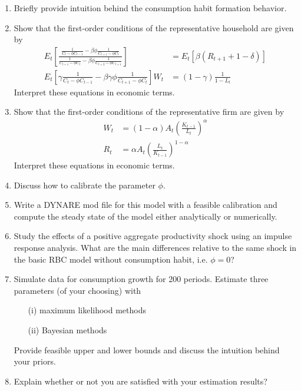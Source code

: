\documentclass[a4paper]{scrartcl}
\begin{document}
\begin{enumerate}
	\item Briefly provide intuition behind the consumption habit formation behavior.
	\item Show that the first-order conditions of the representative household are given by
	\begin{align*}
	E_t\left[ \frac{\frac{1}{C_{t}-\phi C_{t-1}}-\beta \phi \frac{1}{C_{t+1}-\phi C_{t}}}{\frac{1}{C_{t+1}-\phi C_{t}}-\beta \phi \frac{1}{C_{t+2}-\phi C_{t+1}}} \right] &= E_t \left[\beta (R_{t+1}+1-\delta)\right]
	\\
	E_t\left[\gamma \frac{1}{C_t - \phi C_{t-1}}-\beta \gamma \phi \frac{1}{C_{t+1} - \phi C_{t}}\right]W_t &= (1-\gamma)\frac{1}{1-L_t} 
	\end{align*}
	Interpret these equations in economic terms.

	\item Show that the first-order conditions of the representative firm are given by
	\begin{align*}
	W_t &= (1-\alpha) A_t \left(\frac{K_{t-1}}{L_t}\right)^\alpha\\
	R_t &= \alpha A_t \left(\frac{L_t}{K_{t-1}}\right)^{1-\alpha}
	\end{align*}
	Interpret these equations in economic terms.
	\item Discuss how to calibrate the parameter $\phi$.
	\item Write a DYNARE mod file for this model with a feasible calibration and compute the steady state of the model either analytically or numerically.
	\item Study the effects of a positive aggregate productivity shock using an impulse response analysis. What are the main differences relative to the same shock in the basic RBC model without consumption habit, i.e. $\phi=0$?
	\item Simulate data for consumption growth for 200 periods. Estimate three parameters (of your choosing) with 
	\begin{itemize}
		\item[(i)] maximum likelihood methods
		\item[(ii)] Bayesian methods
	\end{itemize}
	Provide feasible upper and lower bounds and discuss the intuition behind your priors. 
	\item Explain whether or not you are satisfied with your estimation results?
\end{enumerate} 
\newpage
\end{document}
